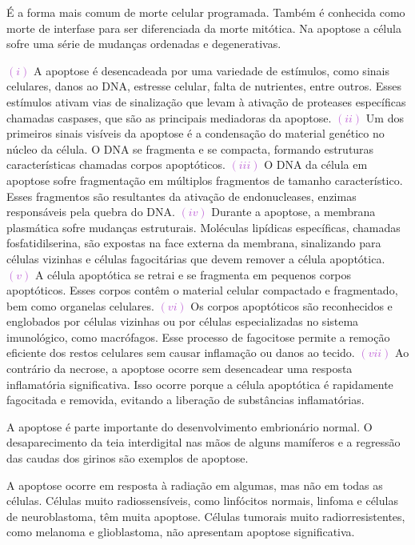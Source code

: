 \documentclass[11pt,a4paper]{article}
\newcounter{exemplo}
\begin{document}
\begin{itemize}[label=\textcolor{CarnationPink}{$\blacktriangleright$}]
		É a forma mais comum de morte celular programada. Também é conhecida como morte de interfase para ser diferenciada da morte mitótica. Na apoptose a célula sofre uma série de mudanças ordenadas e degenerativas.

		\textcolor{MediumOrchid}{$(i)$} A apoptose é desencadeada por uma variedade de estímulos, como sinais celulares, danos ao DNA, estresse celular, falta de nutrientes, entre outros. Esses estímulos ativam vias de sinalização que levam à ativação de proteases específicas chamadas caspases, que são as principais mediadoras da apoptose. \textcolor{MediumOrchid}{$(ii)$} Um dos primeiros sinais visíveis da apoptose é a condensação do material genético no núcleo da célula. O DNA se fragmenta e se compacta, formando estruturas características chamadas corpos apoptóticos. \textcolor{MediumOrchid}{$(iii)$} O DNA da célula em apoptose sofre fragmentação em múltiplos fragmentos de tamanho característico. Esses fragmentos são resultantes da ativação de endonucleases, enzimas responsáveis pela quebra do DNA. \textcolor{MediumOrchid}{$(iv)$}  Durante a apoptose, a membrana plasmática sofre mudanças estruturais. Moléculas lipídicas específicas, chamadas fosfatidilserina, são expostas na face externa da membrana, sinalizando para células vizinhas e células fagocitárias que devem remover a célula apoptótica. \textcolor{MediumOrchid}{$(v)$}  A célula apoptótica se retrai e se fragmenta em pequenos corpos apoptóticos. Esses corpos contêm o material celular compactado e fragmentado, bem como organelas celulares. \textcolor{MediumOrchid}{$(vi)$}  Os corpos apoptóticos são reconhecidos e englobados por células vizinhas ou por células especializadas no sistema imunológico, como macrófagos. Esse processo de fagocitose permite a remoção eficiente dos restos celulares sem causar inflamação ou danos ao tecido. \textcolor{MediumOrchid}{$(vii)$} Ao contrário da necrose, a apoptose ocorre sem desencadear uma resposta inflamatória significativa. Isso ocorre porque a célula apoptótica é rapidamente fagocitada e removida, evitando a liberação de substâncias inflamatórias.

		A apoptose é parte importante do desenvolvimento embrionário normal. O desaparecimento da teia interdigital nas mãos de alguns mamíferos e a regressão das caudas dos girinos são exemplos de apoptose. 

		A apoptose ocorre em resposta à radiação em algumas, mas não em todas as células. Células muito radiossensíveis, como linfócitos normais, linfoma e células de neuroblastoma, têm muita apoptose. Células tumorais muito radiorresistentes, como melanoma e glioblastoma, não apresentam apoptose significativa.


\end{itemize}
\end{document}
